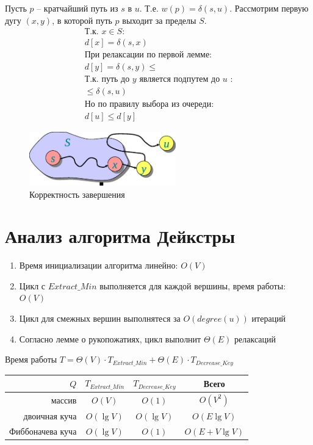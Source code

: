 \documentclass[11pt]{article}
\begin{document}
\begin{enumerate}
Пусть $p$ -- кратчайший путь из $s$ в $u$. Т.е. $w(p) = \delta(s, u)$. Рассмотрим первую дугу $(x, y)$, в которой путь $p$ выходит за пределы $S$.
\begin{align*}
  \text{Т.к. }x \in S: \\
  d[x] = \delta(s, x) \\
  \text{При релаксации по первой лемме:} \\
  d[y] = \delta(s, y) \leqslant \\
  \text{Т.к. путь до }y\text{ является подпутем до }u\text{ :} \\
  \leqslant \delta(s, u) \\
  \text{Но по правилу выбора из очереди:} \\
  d[u] \leqslant d[y]
\end{align*}
\begin{figure}[h!]
  \centering
  \includegraphics[width=2.5in]{lecture17/correctness.eps}
  \caption{Корректность завершения}
\end{figure}
\end{enumerate}

\section{Анализ алгоритма Дейкстры}
\begin{enumerate}
\item Время инициализации алгоритма линейно: $O(V)$
\item Цикл с $Extract\_Min$ выполняется для каждой вершины, время работы: $O(V)$
\item Цикл для смежных вершин выполнятеся за $O(degree(u))$ итераций
\item Согласно лемме о рукопожатиях, цикл выполнит $\Theta(E)$ релаксаций
\end{enumerate}
Время работы $T = \Theta(V) \cdot T_{Extract\_Min} + \Theta(E) \cdot T_{Decrease\_Key}$
\begin{center}
\begin{tabular}{|r|c|c|c|}
  \hline
     $Q$ & $T_{Extract\_Min}$ & $T_{Decrease\_Key}$ & Всего \\
  \hline
      массив & $O(V)$ & $O(1)$ & $O(V^2)$ \\
  \hline
      двоичная куча & $O(\lg V)$ & $O(\lg V)$ & $O(E \lg V)$ \\
  \hline
      Фиббоначева куча & $O(\lg V)$ & $O(1)$ & $O(E + V \lg V)$ \\
  \hline
\end{tabular}
\end{center}
\end{document}
